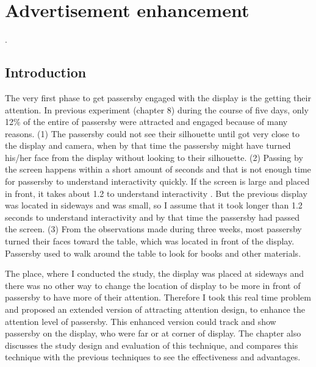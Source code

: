 \chapter{Advertisement enhancement} %

\label{Chapter9} %
\newpage
.
\newpage

\section{Introduction}

The very first phase to get passersby engaged with the display is the getting their attention. In previous experiment (chapter 8) during the course of five days, only 12\% of the entire of passersby were attracted and engaged because of many reasons. (1) The passersby could not see their silhouette until got very close to the display and camera, when by that time the passersby might have turned his/her face from the display without looking to their silhouette. (2) Passing by the screen happens within a short amount of seconds and that is not enough time for passersby to understand interactivity quickly. If the screen is large and placed in front, it takes about 1.2 to understand interactivity \cite{LookingGlass}. But the previous display was located in sideways and was small, so I assume that it took longer than 1.2 seconds to understand interactivity and by that time the passersby had passed the screen. (3) From the observations made during three weeks, most passersby turned their faces toward the table, which was located in front of the display. Passersby used to walk around the table to look for books and other materials. 

The place, where I conducted the study, the display was placed at sideways and there was no other way to change the location of display to be more in front of passersby to have more of their attention. Therefore I took this real time problem and proposed an extended version of attracting attention design, to enhance the attention level of passersby. This enhanced version could track and show passersby on the display, who were far or at corner of display. The chapter also discusses the study design and evaluation of this technique, and compares this technique with the previous techniques to see the effectiveness and advantages.



